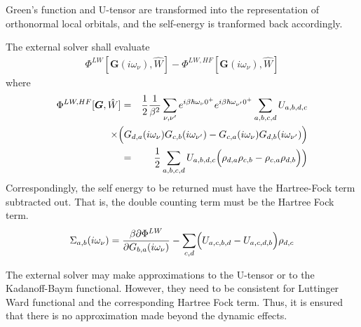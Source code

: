 \documentclass[11pt,a4paper]{report}
\newcommand{\mat}[1]{\bm{#1}}  %
\begin{document}
\begin{enumerate}
Green's function and U-tensor are transformed into the representation
of orthonormal local orbitals, and the self-energy is tranformed back
accordingly.

The external solver shall evaluate
\begin{eqnarray}
\Phi^{LW}[\mat{G}(i\omega_\nu),\hat{W}]
-\Phi^{LW,HF}[\mat{G}(i\omega_\nu),\hat{W}]
\end{eqnarray}
where
\begin{eqnarray}
  \Phi^{LW,HF}[\mat{G},\hat{W}]
  &=&
  \frac{1}{2}
  \frac{1}{\beta^{2}} 
  \sum_{\nu,\nu'} e^{i \beta \hbar \omega_\nu 0^{+}} e^{i \beta \hbar \omega_{\nu'} 0^{+}}
  \sum_{a,b,c,d}
  U_{a,b,d,c} 
  \nonumber\\ 
  &&\hspace{-1.2cm}\times\Big(
  G_{d,a}(i\omega_\nu)G_{c,b}(i\omega_{\nu'})
  -  G_{c,a}(i\omega_\nu)G_{d,b}(i\omega_{\nu'})
  \Big) 
\nonumber\\
&=& \frac{1}{2}
  \sum_{a,b,c,d}
  U_{a,b,d,c} \Bigl(
  \rho_{d,a}\rho_{c,b} -  \rho_{c,a}\rho_{d,b}\Bigr)
  \Big) 
\end{eqnarray}
Correspondingly, the self energy to be returned must have the
Hartree-Fock term subtracted out. That is, the double counting term
must be the Hartree Fock term.
\begin{eqnarray*}
\Sigma_{a,b}(i\omega_\nu)=\frac{\beta\partial\Phi^{LW}}
{\partial G_{b,a}(i\omega_\nu)}-\sum_{c,d}\Bigl(U_{a,c,b,d}-U_{a,c,d,b}\Bigr)
\rho_{d,c}
\end{eqnarray*}

The external solver may make approximations to the U-tensor or to the
Kadanoff-Baym functional. However, they need to be consistent for
Luttinger Ward functional and the corresponding Hartree Fock
term. Thus, it is ensured that there is no approximation made beyond
the dynamic effects.


\end{enumerate}
\end{document}
